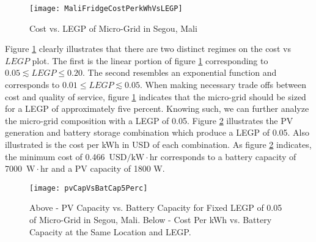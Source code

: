 \documentclass{article}
\newcommand{\unit}[1]{\ensuremath{\, \mathrm{#1}}}
\begin{document}
\begin{figure}[ht]  
  \centering
    \texttt{[image: MaliFridgeCostPerkWhVsLEGP]}
  \caption{Cost vs. LEGP of Micro-Grid in Segou, Mali}
  \label{CostVLEGPMali}
\end{figure}

Figure \ref{CostVLEGPMali} clearly illustrates that there are two distinct regimes on the cost vs $LEGP$ plot. 
The first is the linear portion of figure \ref{CostVLEGPMali} corresponding to $ 0.05 \lesssim LEGP \leq 0.20$. 
The second resembles an exponential function and corresponds to $ 0.01 \leq LEGP \lesssim 0.05$. 
When making necessary trade offs between cost and quality of service, figure \ref{CostVLEGPMali} indicates that the micro-grid should be sized for a LEGP of approximately five percent.
Knowing such, we can further analyze the micro-grid composition with a LEGP of 0.05.
Figure \ref{pvBat5} illustrates the PV generation and battery storage combination which produce a LEGP of 0.05. 
Also illustrated is the cost per kWh in USD of each combination. 
As figure \ref{pvBat5} indicates, the minimum cost of 0.466 \unit{USD/kW\cdot hr} corresponds to a battery capacity of 7000 \unit{W\cdot hr} and a PV capacity of 1800 W.

\begin{figure}[ht] 
  \centering
    \texttt{[image: pvCapVsBatCap5Perc]}
  \caption{Above - PV Capacity vs. Battery Capacity for Fixed LEGP of 0.05 of Micro-Grid in Segou, Mali. Below - Cost Per kWh vs. Battery Capacity at the Same Location and LEGP.}
\label{pvBat5}
\end{figure}
\end{document}
